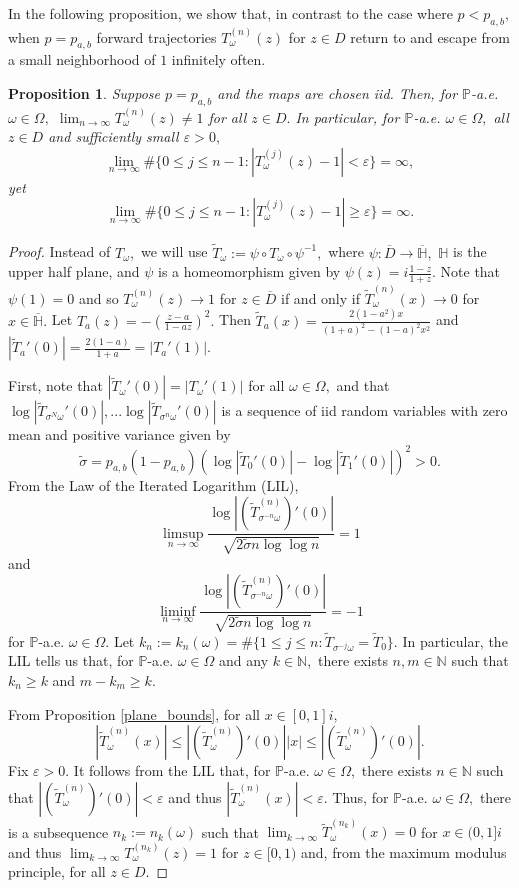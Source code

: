 \documentclass[12pt,reqno]{amsart}
\numberwithin{theorem}{section}
\newtheorem{proposition}[theorem]{Proposition}%
\begin{document}
In the following proposition, we show that, in contrast to the case where $p<p_{a,b},$ when $p=p_{a,b}$ forward trajectories $T_{\omega}^{(n)}(z)$ for $z\in D$ return to and escape from a small neighborhood of $1$ infinitely often.
\begin{proposition}\label{forward_divergence}
    Suppose $p=p_{a,b}$ and the maps are chosen iid. Then, for $\mathbb{P}$-a.e. $\omega\in\Omega,$ $\lim_{n\to\infty}T_{\omega}^{(n)}(z)\neq1$ for all $z\in D.$ In particular, for $\mathbb{P}$-a.e. $\omega\in\Omega,$ all $z\in D$ and sufficiently small $\varepsilon>0,$ $$\lim_{n\to\infty}\#\{0\le j\le n-1:|T_{\omega}^{(j)}(z)-1|<\varepsilon\}=\infty,$$ yet   $$\lim_{n\to\infty}\#\{0\le j\le n-1:|T_{\omega}^{(j)}(z)-1|\ge\varepsilon\}=\infty.$$ 
\end{proposition}
\begin{proof}
    Instead of $T_{\omega},$ we will use $\tilde{T}_{\omega}:=\psi\circ T_{\omega}\circ\psi^{-1},$ where $\psi:\overline{D}\to\overline{\mathbb{H}},$ $\mathbb{H}$ is the upper half plane, and $\psi$ is a homeomorphism given by $\psi(z)=i\frac{1-z}{1+z}.$ Note that $\psi(1)=0$ and so $T_{\omega}^{(n)}(z)\to1$ for $z\in\overline{D}$ if and only if $\tilde{T}_{\omega}^{(n)}(x)\to0$ for $x\in\overline{\mathbb{H}}.$  Let $T_{a}(z)=-\left(\frac{z-a}{1-az}\right)^2.$ Then $\tilde{T}_{a}(x)=\frac{2(1-a^2)x}{(1+a)^2-(1-a)^2x^2}$ and $|\tilde{T}_{a}'(0
     )|=\frac{2(1-a)}{1+a}=|T_{a}'(1)|.$

     First, note that $|\tilde{T}_{\omega}'(0)|=|T_{\omega}'(1)|$ for all $\omega\in\Omega,$ and that $\log|\tilde{T}_{\sigma^{N}\omega}'(0)|,...\log|\tilde{T}_{\sigma^{n}\omega}'(0)|$ is a sequence of iid random variables with zero mean and positive variance given by $$\tilde{\sigma}=p_{a,b}(1-p_{a,b})(\log|\tilde{T}_{0}'(0)|-\log|\tilde{T}_{1}'(0)|)^2>0.$$ From the Law of the Iterated Logarithm (LIL), $$\limsup_{n\to\infty}\frac{\log|(\tilde{T}^{(n)}_{\sigma^{-n}\omega})'(0)|}{\sqrt{2\tilde{\sigma}n\log\log n}}=1$$ and $$\liminf_{n\to\infty}\frac{\log|(\tilde{T}^{(n)}_{\sigma^{-n}\omega})'(0)|}{\sqrt{2\tilde{\sigma}n\log\log n}}=-1$$ for $\mathbb{P}$-a.e. $\omega\in\Omega$.
     Let $k_n:=k_n(\omega)=\#\{1\le j\le n:\tilde{T}_{\sigma^{-j}\omega}=\tilde{T}_0\}.$ In particular, the LIL tells us that, for $\mathbb{P}$-a.e. $\omega\in\Omega$ and any $k\in\mathbb{N},$ there exists $n,m\in\mathbb{N}$ such that $k_n\ge k$ and $m-k_m\ge k.$

      From Proposition \ref{plane_bounds}, for all $x\in[0,1]i,$ $$|\tilde{T}_{\omega}^{(n)}(x)|\le|(\tilde{T}_{\omega}^{(n)})'(0)||x|\le|(\tilde{T}_{\omega}^{(n)})'(0)|.$$ Fix $\varepsilon>0.$ It follows from the LIL that, for $\mathbb{P}$-a.e. $\omega\in\Omega,$ there exists $n\in\mathbb{N}$ such that $|(\tilde{T}_{\omega}^{(n)})'(0)|<\varepsilon$ and thus $|\tilde{T}_{\omega}^{(n)}(x)|<\varepsilon.$ Thus, for $\mathbb{P}$-a.e. $\omega\in\Omega,$ there is a subsequence $n_k:=n_k(\omega)$ such that $\lim_{k\to\infty}\tilde{T}_{\omega}^{(n_k)}(x)=0$ for $x\in(0,1]i$ and thus $\lim_{k\to\infty}T_{\omega}^{(n_k)}(z)=1$ for $z\in[0,1)$ and, from the maximum modulus principle, for all $z\in D.$


\end{proof}
\end{document}
